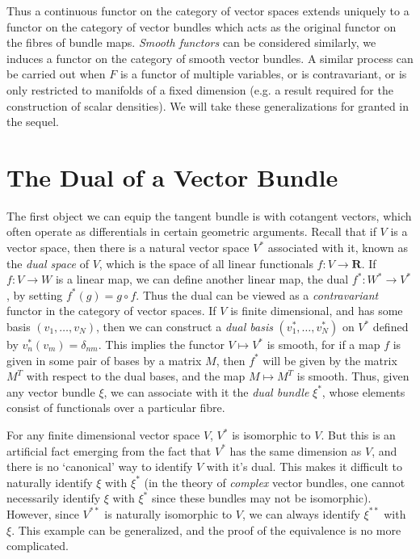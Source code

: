 Thus a continuous functor on the category of vector spaces extends uniquely to a functor on the category of vector bundles which acts as the original functor on the fibres of bundle maps. \emph{Smooth functors} can be considered similarly, we induces a functor on the category of smooth vector bundles. A similar process can be carried out when $F$ is a functor of multiple variables, or is contravariant, or is only restricted to manifolds of a fixed dimension (e.g. a result required for the construction of scalar densities). We will take these generalizations for granted in the sequel.

\section{The Dual of a Vector Bundle}

The first object we can equip the tangent bundle is with cotangent vectors, which often operate as differentials in certain geometric arguments. Recall that if $V$ is a vector space, then there is a natural vector space $V^*$ associated with it, known as the {\it dual space} of $V$, which is the space of all linear functionals $f: V \to \mathbf{R}$. If $f: V \to W$ is a linear map, we can define another linear map, the dual $f^*: W^* \to V^*$, by setting $f^*(g) = g \circ f$. Thus the dual can be viewed as a {\it contravariant} functor in the category of vector spaces. If $V$ is finite dimensional, and has some basis $(v_1, \dots, v_N)$, then we can construct a {\it dual basis} $(v_1^*, \dots, v_N^*)$ on $V^*$ defined by $v_n^*(v_m) = \delta_{nm}$. This implies the functor $V \mapsto V^*$ is smooth, for if a map $f$ is given in some pair of bases by a matrix $M$, then $f^*$ will be given by the matrix $M^T$ with respect to the dual bases, and the map $M \mapsto M^T$ is smooth. Thus, given any vector bundle $\xi$, we can associate with it the {\it dual bundle} $\xi^*$, whose elements consist of functionals over a particular fibre.

For any finite dimensional vector space $V$, $V^*$ is isomorphic to $V$. But this is an artificial fact emerging from the fact that $V^*$ has the same dimension as $V$, and there is no `canonical' way to identify $V$ with it's dual. This makes it difficult to naturally identify $\xi$ with $\xi^*$ (in the theory of \emph{complex} vector bundles, one cannot necessarily identify $\xi$ with $\xi^*$ since these bundles may not be isomorphic). However, since $V^{**}$ is naturally isomorphic to $V$, we can always identify $\xi^{**}$ with $\xi$. This example can be generalized, and the proof of the equivalence is no more complicated.

